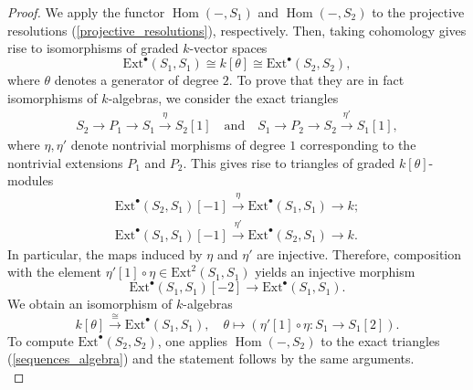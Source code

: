 \documentclass[a4paper, twoside, 11pt]{amsart}
\theoremstyle{definition}
\theoremstyle{remark}
\numberwithin{equation}{theorem}
\DeclareMathOperator{\Hom}{Hom}
\begin{document}
\begin{proof}
    We apply the functor $\Hom(-, S_1)$ and $\Hom(-,S_2)$ to the projective resolutions (\ref{projective_resolutions}), respectively. Then, taking  cohomology gives rise to isomorphisms of graded $k$-vector spaces 
    \begin{equation*}
        \mathrm{Ext}^{\bullet}(S_1, S_1) \cong k[\theta] \cong \mathrm{Ext}^{\bullet}(S_2, S_2),
    \end{equation*}
    where $\theta$ denotes a generator of degree $2$.
    To prove that they are in fact isomorphisms of $k$-algebras, we consider the exact triangles
    \begin{equation}\label{sequences_algebra}
        \begin{aligned}
        S_2 \longrightarrow P_1 \longrightarrow S_1 \overset{\eta}{\longrightarrow} S_2[1]
        \quad \text{and} \quad 
        S_1 \longrightarrow P_2 \longrightarrow S_2 \overset{\eta'}{\longrightarrow} S_1[1],
        \end{aligned}
    \end{equation}
    where $\eta, \eta'$ denote nontrivial morphisms of degree $1$ corresponding to the nontrivial extensions $P_1$ and $P_2$. This gives rise to triangles of graded $k[\theta]$-modules
    \begin{equation*}
    \begin{aligned}
        \mathrm{Ext}^{\bullet}(S_2,S_1)[-1] \overset{\eta}{\longrightarrow} \mathrm{Ext}^{\bullet}(S_1,S_1) \longrightarrow k; \\
        \mathrm{Ext}^{\bullet}(S_1,S_1)[-1] \overset{\eta'}{\longrightarrow} \mathrm{Ext}^{\bullet}(S_2,S_1) \longrightarrow k.
    \end{aligned}
    \end{equation*}
    In particular, the maps induced by $\eta$ and $\eta'$ are injective. Therefore, composition with the element $\eta'[1]\circ\eta \in \mathrm{Ext}^{2}(S_1,S_1)$ yields an injective morphism 
    \begin{equation*}
        \mathrm{Ext}^{\bullet}(S_1,S_1)[-2] \longrightarrow \mathrm{Ext}^{\bullet}(S_1,S_1).
    \end{equation*}
    We obtain an isomorphism of $k$-algebras
    \begin{equation*}
        k[\theta] \overset{\cong}{\longrightarrow} \mathrm{Ext}^{\bullet}(S_1,S_1), \quad \theta \mapsto (\eta'[1] \circ\eta\colon S_1 \to S_1[2]).
    \end{equation*}
    To compute $\mathrm{Ext}^{\bullet}(S_2,S_2)$, one applies $\Hom(-,S_2)$ to the exact triangles (\ref{sequences_algebra}) and the statement follows by the same arguments. \\

\end{proof}
\end{document}
